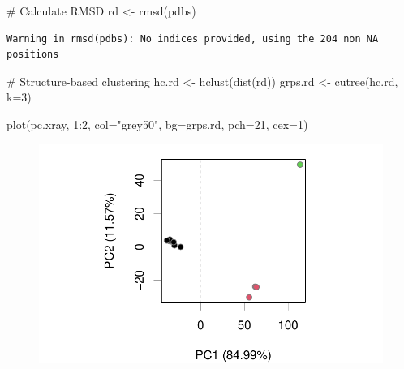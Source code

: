 \documentclass[
  letterpaper,
  DIV=11,
  numbers=noendperiod]{scrartcl}
\newenvironment{Shaded}{\begin{snugshade}}{\end{snugshade}}
\newcommand{\AttributeTok}[1]{\textcolor[rgb]{0.40,0.45,0.13}{#1}}
\newcommand{\CommentTok}[1]{\textcolor[rgb]{0.37,0.37,0.37}{#1}}
\newcommand{\DecValTok}[1]{\textcolor[rgb]{0.68,0.00,0.00}{#1}}
\newcommand{\FunctionTok}[1]{\textcolor[rgb]{0.28,0.35,0.67}{#1}}
\newcommand{\NormalTok}[1]{\textcolor[rgb]{0.00,0.23,0.31}{#1}}
\newcommand{\OtherTok}[1]{\textcolor[rgb]{0.00,0.23,0.31}{#1}}
\newcommand{\SpecialCharTok}[1]{\textcolor[rgb]{0.37,0.37,0.37}{#1}}
\newcommand{\StringTok}[1]{\textcolor[rgb]{0.13,0.47,0.30}{#1}}
\begin{document}
\begin{Shaded}
\begin{Highlighting}[]
\CommentTok{\# Calculate RMSD}
\NormalTok{rd }\OtherTok{\textless{}{-}} \FunctionTok{rmsd}\NormalTok{(pdbs)}
\end{Highlighting}
\end{Shaded}

\begin{verbatim}
Warning in rmsd(pdbs): No indices provided, using the 204 non NA positions
\end{verbatim}

\begin{Shaded}
\begin{Highlighting}[]
\CommentTok{\# Structure{-}based clustering}
\NormalTok{hc.rd }\OtherTok{\textless{}{-}} \FunctionTok{hclust}\NormalTok{(}\FunctionTok{dist}\NormalTok{(rd))}
\NormalTok{grps.rd }\OtherTok{\textless{}{-}} \FunctionTok{cutree}\NormalTok{(hc.rd, }\AttributeTok{k=}\DecValTok{3}\NormalTok{)}

\FunctionTok{plot}\NormalTok{(pc.xray, }\DecValTok{1}\SpecialCharTok{:}\DecValTok{2}\NormalTok{, }\AttributeTok{col=}\StringTok{"grey50"}\NormalTok{, }\AttributeTok{bg=}\NormalTok{grps.rd, }\AttributeTok{pch=}\DecValTok{21}\NormalTok{, }\AttributeTok{cex=}\DecValTok{1}\NormalTok{)}
\end{Highlighting}
\end{Shaded}

\begin{figure}[H]

{\centering \includegraphics{Class09_files/figure-pdf/unnamed-chunk-14-1.pdf}

}

\end{figure}
\end{document}
